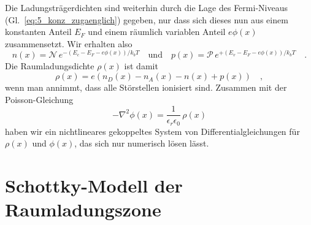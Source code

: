 Die Ladungsträgerdichten sind weiterhin durch die Lage des Fermi-Niveaus (Gl.~\ref{eq:5_konz_zugaenglich}) gegeben, nur dass sich dieses nun aus einem konstanten Anteil $E_F$ und einem räumlich variablen Anteil $e \phi(x)$ zusammensetzt. Wir erhalten also 
\begin{equation}
    n(x)  = \mathcal{N} \, e^{- (E_c - E_F - e\phi(x)) / k_b T} \quad \text{und} \quad   
    p(x) =  \mathcal{P} \, e^{+ (E_v - E_F  - e\phi(x)) / k_b T} \quad . \label{eq:5_n_of_x}
\end{equation}
Die  Raumladungsdichte $\rho(x)$ ist damit
\begin{equation}
    \rho(x) = e \left( n_D(x) - n_A(x) - n(x) + p(x) \right) \quad ,
\end{equation}
wenn man annimmt, dass alle Störstellen ionisiert sind. Zusammen mit der Poisson-Gleichung
\begin{equation}
    - \nabla^2 \phi(x) = \frac{1}{\epsilon_r \epsilon_0} \, \rho (x)
\end{equation}
haben wir ein nichtlineares gekoppeltes  System von Differentialgleichungen für $\rho(x)$ und $\phi(x)$, das sich nur numerisch lösen lässt.




\section*{Schottky-Modell der Raumladungszone}


